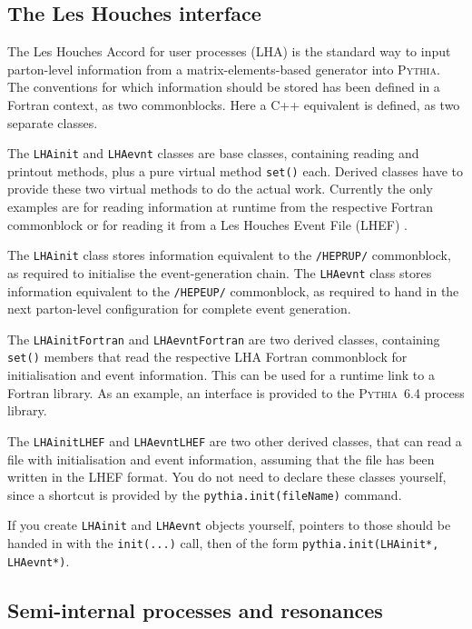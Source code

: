 \documentclass{elsartmod}
\begin{document}
\subsection{The Les Houches interface}

The Les Houches Accord for user processes (LHA) \cite{lha} is the 
standard way to input parton-level information from a 
matrix-elements-based generator into \textsc{Pythia}. The conventions 
for which information should be stored has been defined in a Fortran 
context, as two commonblocks. Here a C++ equivalent is defined, 
as two separate classes.

The \texttt{LHAinit} and \texttt{LHAevnt} classes are base classes, 
containing reading and printout methods, plus a pure virtual 
method \texttt{set()} each. Derived classes have to provide these two 
virtual methods to do the actual work. Currently the only examples 
are for reading information at runtime from the respective 
Fortran commonblock or for reading it from a Les Houches Event File 
(LHEF) \cite{lhef}.

The \texttt{LHAinit} class stores information equivalent to the 
\texttt{/HEPRUP/} commonblock, as required to initialise the 
event-generation chain.
The \texttt{LHAevnt} class stores information equivalent to the 
\texttt{/HEPEUP/} commonblock, as required to hand in the next 
parton-level configuration for complete event generation. 

The \texttt{LHAinitFortran} and \texttt{LHAevntFortran} are two
derived classes, containing \texttt{set()} members that read the 
respective LHA Fortran commonblock for initialisation and event
information. This can be used for a runtime link to a Fortran 
library. As an example, an interface is provided to the 
\textsc{Pythia}~6.4 process library.

The \texttt{LHAinitLHEF} and \texttt{LHAevntLHEF} are two
other derived classes, that can read a file with initialisation and 
event information, assuming that the file has been written in the
LHEF format. You do not need to declare these classes yourself,
since a shortcut is provided by the \texttt{pythia.init(fileName)}
command. 

If you create \texttt{LHAinit} and \texttt{LHAevnt} objects yourself, 
pointers to those should be handed in with the \texttt{init(...)} call, 
then of the form \texttt{pythia.init(LHAinit*, LHAevnt*)}. 

\subsection{Semi-internal processes and resonances}
\end{document}
